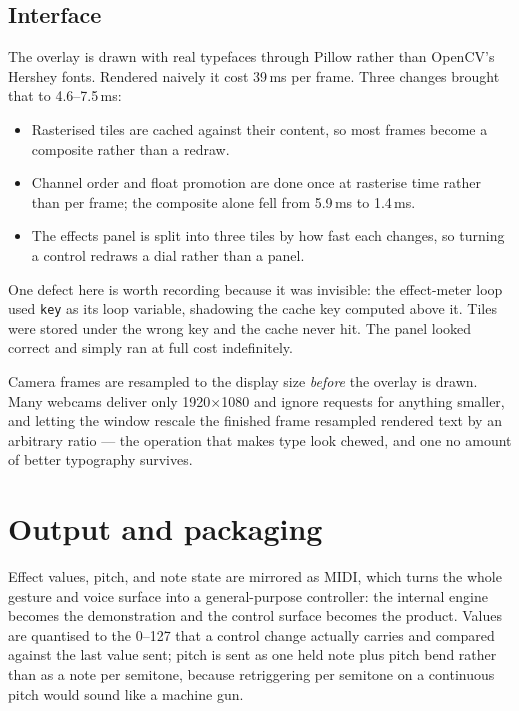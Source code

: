 \documentclass[a4paper,11pt]{article}
\newcommand{\code}[1]{\texttt{\small #1}}
\begin{document}
\subsection{Interface}

The overlay is drawn with real typefaces through Pillow rather than OpenCV's
Hershey fonts. Rendered naively it cost 39\,ms per frame. Three changes brought
that to 4.6--7.5\,ms:

\begin{itemize}\itemsep2pt
\item Rasterised tiles are cached against their content, so most frames become
      a composite rather than a redraw.
\item Channel order and float promotion are done once at rasterise time rather
      than per frame; the composite alone fell from 5.9\,ms to 1.4\,ms.
\item The effects panel is split into three tiles by how fast each changes, so
      turning a control redraws a dial rather than a panel.
\end{itemize}

One defect here is worth recording because it was invisible: the effect-meter
loop used \code{key} as its loop variable, shadowing the cache key computed
above it. Tiles were stored under the wrong key and the cache never hit. The
panel looked correct and simply ran at full cost indefinitely.

Camera frames are resampled to the display size \emph{before} the overlay is
drawn. Many webcams deliver only 1920$\times$1080 and ignore requests for
anything smaller, and letting the window rescale the finished frame resampled
rendered text by an arbitrary ratio --- the operation that makes type look
chewed, and one no amount of better typography survives.

\section{Output and packaging}

Effect values, pitch, and note state are mirrored as MIDI, which turns the
whole gesture and voice surface into a general-purpose controller: the internal
engine becomes the demonstration and the control surface becomes the product.
Values are quantised to the 0--127 that a control change actually carries and
compared against the last value sent; pitch is sent as one held note plus pitch
bend rather than as a note per semitone, because retriggering per semitone on a
continuous pitch would sound like a machine gun.
\end{document}
